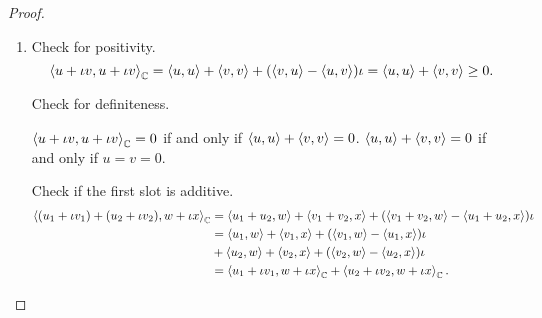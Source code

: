 \begin{proof}
    \begin{enumerate}[label={(\alph*)}]
        \item Check for positivity.
              \[
                  \left\langle{u + \iota v, u + \iota v}\right\rangle_{\mathbb{C}} = \left\langle{u, u}\right\rangle + \left\langle{v, v}\right\rangle + (\left\langle{v, u}\right\rangle - \left\langle{u, v}\right\rangle)\iota = \left\langle{u, u}\right\rangle + \left\langle{v, v}\right\rangle \geq 0.
              \]

              Check for definiteness.

              $\left\langle{u + \iota v, u + \iota v}\right\rangle_{\mathbb{C}} = 0$ if and only if $\left\langle{u, u}\right\rangle + \left\langle{v, v}\right\rangle = 0$. $\left\langle{u, u}\right\rangle + \left\langle{v, v}\right\rangle = 0$ if and only if $u = v = 0$.

              Check if the first slot is additive.
              \begin{align*}
                  \left\langle{(u_{1} + \iota v_{1}) + (u_{2} + \iota v_{2}), w + \iota x}\right\rangle_{\mathbb{C}} & = \left\langle{u_{1} + u_{2}, w}\right\rangle + \left\langle{v_{1} + v_{2}, x}\right\rangle + (\left\langle{v_{1} + v_{2}, w}\right\rangle - \left\langle{u_{1} + u_{2}, x}\right\rangle)\iota \\
                                                                                                      & = \left\langle{u_{1}, w}\right\rangle + \left\langle{v_{1}, x}\right\rangle + (\left\langle{v_{1},w}\right\rangle - \left\langle{u_{1}, x}\right\rangle)\iota                                  \\
                                                                                                      & + \left\langle{u_{2}, w}\right\rangle + \left\langle{v_{2}, x}\right\rangle + (\left\langle{v_{2}, w}\right\rangle - \left\langle{u_{2}, x}\right\rangle)\iota                                 \\
                                                                                                      & = \left\langle{u_{1} + \iota v_{1}, w + \iota x}\right\rangle_{\mathbb{C}} + \left\langle{u_{2} + \iota v_{2}, w + \iota x}\right\rangle_{\mathbb{C}}.
              \end{align*}


\end{enumerate}
\end{proof}
